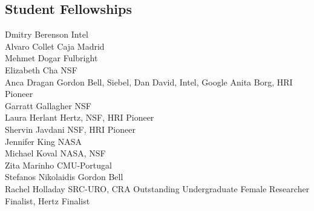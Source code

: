 \subsection{Student Fellowships}
\noindent
Dmitry Berenson \hfill Intel\\
Alvaro Collet \hfill Caja Madrid\\
Mehmet Dogar \hfill Fulbright\\
Elizabeth Cha \hfill NSF\\
Anca Dragan \hfill Gordon Bell, Siebel, Dan David, Intel, Google Anita Borg, HRI Pioneer\\
Garratt Gallagher \hfill NSF\\
Laura Herlant \hfill Hertz, NSF, HRI Pioneer\\
Shervin Javdani \hfill NSF, HRI Pioneer\\
Jennifer King \hfill NASA\\
Michael Koval \hfill NASA, NSF\\
Zita Marinho \hfill CMU-Portugal\\
Stefanos Nikolaidis \hfill Gordon Bell\\
Rachel Holladay \hfill SRC-URO, CRA Outstanding Undergraduate Female Researcher Finalist, Hertz Finalist\\


